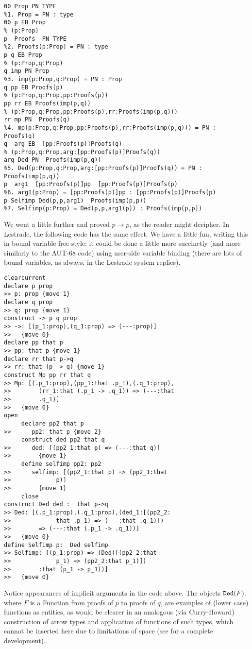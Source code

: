 \documentclass{article}
\begin{document}
   \begin{verbatim}
00 Prop PN TYPE
%1. Prop = PN : type
00 p EB Prop
% (p:Prop)
p  Proofs  PN TYPE
%2. Proofs(p:Prop) = PN : type
p q EB Prop
% (p:Prop,q:Prop)
q imp PN Prop
%3. imp(p:Prop,q:Prop) = PN : Prop
q pp EB Proofs(p)
% (p:Prop,q:Prop,pp:Proofs(p))
pp rr EB Proofs(imp(p,q))
% (p:Prop,q:Prop,pp:Proofs(p),rr:Proofs(imp(p,q)))
rr mp PN  Proofs(q)
%4. mp(p:Prop,q:Prop,pp:Proofs(p),rr:Proofs(imp(p,q))) = PN : Proofs(q)
q  arg EB  [pp:Proofs(p)]Proofs(q)
% (p:Prop,q:Prop,arg:[pp:Proofs(p)]Proofs(q))
arg Ded PN  Proofs(imp(p,q))
%5. Ded(p:Prop,q:Prop,arg:[pp:Proofs(p)]Proofs(q)) = PN : Proofs(imp(p,q))
p  arg1  [pp:Proofs(p)]pp  [pp:Proofs(p)]Proofs(p)
%6. arg1(p:Prop) = [pp:Proofs(p)]pp : [pp:Proofs(p)]Proofs(p)
p Selfimp Ded(p,p,arg1)  Proofs(imp(p,p))
%7. Selfimp(p:Prop) = Ded(p,p,arg1(p)) : Proofs(imp(p,p))
\end{verbatim}

We went a little further and proved $p \rightarrow p$, as the reader might decipher.  In Lestrade, the following code has the same effect.  We have a little fun, writing this in bound variable free style:  it could be done a little more succinctly (and more similarly to the AUT-68 code) using user-side variable binding (there are lots of bound variables, as always, in the Lestrade system replies).

\begin{verbatim}
clearcurrent
declare p prop
>> p: prop {move 1}
declare q prop
>> q: prop {move 1}
construct -> p q prop
>> ->: [(p_1:prop),(q_1:prop) => (---:prop)]
>>   {move 0}
declare pp that p
>> pp: that p {move 1}
declare rr that p->q
>> rr: that (p -> q) {move 1}
construct Mp pp rr that q
>> Mp: [(.p_1:prop),(pp_1:that .p_1),(.q_1:prop),
>>        (rr_1:that (.p_1 -> .q_1)) => (---:that 
>>        .q_1)]
>>   {move 0}
open
     declare pp2 that p
>>      pp2: that p {move 2}
     construct ded pp2 that q
>>      ded: [(pp2_1:that p) => (---:that q)]
>>        {move 1}
     define selfimp pp2: pp2
>>      selfimp: [(pp2_1:that p) => (pp2_1:that 
>>             p)]
>>        {move 1}
     close
construct Ded ded :  that p->q
>> Ded: [(.p_1:prop),(.q_1:prop),(ded_1:[(pp2_2:
>>             that .p_1) => (---:that .q_1)])
>>        => (---:that (.p_1 -> .q_1))]
>>   {move 0}
define Selfimp p:  Ded selfimp
>> Selfimp: [(p_1:prop) => (Ded([(pp2_2:that 
>>             p_1) => (pp2_2:that p_1)])
>>        :that (p_1 -> p_1))]
>>   {move 0}
\end{verbatim}

  Notice appearances of implicit arguments in the code above.  The objects
${\tt Ded}(F)$, where $F$ is a Function from proofs of $p$ to proofs of $q$, are examples of (lower case) functions as entities, as would be clearer in an analogous (via Curry-Howard) construction of arrow types and application of functions of such types, which cannot be inserted here due to limitations of space (see \cite{lestrademanual} for a complete development).
\end{document}
